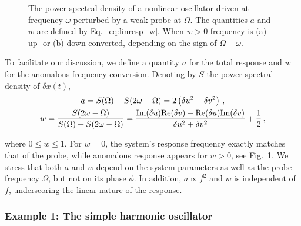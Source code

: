 \begin{figure}
	\centering
	
	\caption{The power spectral density of a nonlinear oscillator driven at frequency $\omega$ perturbed by a weak probe at $\Omega$. The quantities $a$ and $w$ are defined by Eq.~\eqref{eq:linresp_w}. When $w > 0$ frequency is (a) up- or (b) down-converted, depending on the sign of $\Omega - \omega$.}
	\label{fig:linresp_w_illustr}
\end{figure}

To facilitate our discussion, we define a quantity $a$ for the total response and $w$ for the anomalous frequency conversion. Denoting by $S$ the power spectral density of $\delta x(t)$,
\begin{equation} \label{eq:linresp_w}
\begin{gathered}
a = {S(\Omega) + S(2\omega - \Omega)} =  2 \left(\delta u^2 + \delta v^2 \right) \,, \\ \vspace*{1.5mm} 
w = \frac{S(2\omega - \Omega)}{S(\Omega) + S(2\omega - \Omega)} = \frac{  \im{\delta u} \re{\delta v}  - \re{\delta u} \im{\delta v}}{\delta u^2 + \delta v^2} + \frac{1}{2} \,,
\end{gathered}
\end{equation}
where $0 \leq w \leq 1$. For $w=0$, the system's response frequency exactly matches that of the probe, while anomalous response appears for $w > 0$, see Fig.~\ref{fig:linresp_w_illustr}. We stress that both $a$ and $w$ depend on the system parameters as well as the probe frequency $\Omega$, but not on its phase $\phi$. In addition, $a \propto f^2$ and $w$ is independent of $f$, underscoring the linear nature of the response.

\subsubsection{Example 1: The simple harmonic oscillator}

